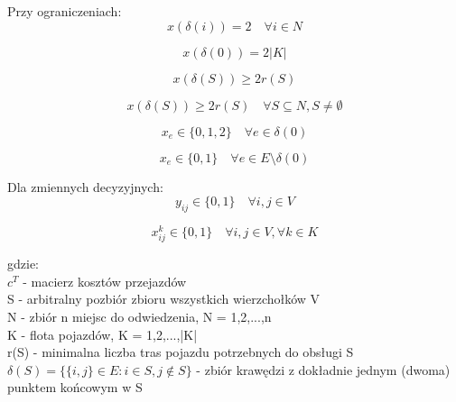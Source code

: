 \documentclass[a4paper, twoside, 12pt, justified]{article}
\begin{document}
	Przy ograniczeniach:\\
	\begin{equation}
	{x(\delta(i)) = 2 \quad \forall i \in N }
	\end{equation}
	
	\begin{equation}
	{x(\delta(0)) = 2|K| }
	\end{equation}
	
	\begin{equation}
	{x(\delta(S)) \geq 2r(S) }
	\end{equation}
	
	\begin{equation}
	{x(\delta(S)) \geq 2r(S) \quad \forall S \subseteq N, S \neq \emptyset}
	\end{equation}
	
	\begin{equation}
	{x_e \in \{0,1,2\} \quad \forall e \in \delta(0)}
	\end{equation}
	
	\begin{equation}
	{x_e \in \{0,1\} \quad \forall e \in E \setminus \delta(0)}
	\end{equation}
	
	
	Dla zmiennych decyzyjnych:\\
	
	\begin{equation}
	{ y_{ij} \in \{0,1\} \quad \forall i,j \in V }
	\end{equation}
	
	\begin{equation}
	{ x_{ij}^{k} \in \{0,1\} \quad \forall i,j \in V, \forall k \in K }
	\end{equation}
	
	gdzie:\\	
	$c^T$ - macierz kosztów przejazdów\\
	S - arbitralny pozbiór zbioru wszystkich wierzchołków V\\
	N - zbiór n miejsc do odwiedzenia, N = {1,2,...,n}\\
	K - flota pojazdów, K = {1,2,...,|K|}\\
	r(S) - minimalna liczba tras pojazdu potrzebnych do obsługi S\\
	$\delta(S) = \{\{i,j\} \in E : i \in S, j \notin S \}$ - zbiór krawędzi z dokładnie jednym (dwoma) punktem końcowym w S\\
	 
\end{document}
